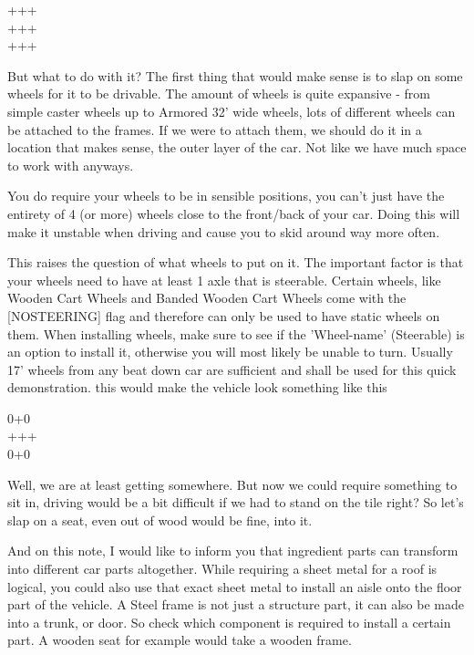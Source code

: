 \begin{spacing}{0.75}
+++\\
+++\\
+++
\end{spacing}

But what to do with it? The first thing that would make sense is to slap on some wheels for it to be drivable. The amount of wheels is quite expansive - from simple caster wheels up to Armored 32' wide wheels, lots of different wheels can be attached to the frames. If we were to attach them, we should do it in a location that makes sense, the outer layer of the car. Not like we have much space to work with anyways.

You do require your wheels to be in sensible positions, you can't just have the entirety of 4 (or more) wheels close to the front/back of your car. Doing this will make it unstable when driving and cause you to skid around way more often.

This raises the question of what wheels to put on it. The important factor is that your wheels need to have at least 1 axle that is steerable. Certain wheels, like Wooden Cart Wheels and Banded Wooden Cart Wheels come with the [NOSTEERING] flag and therefore can only be used to have static wheels on them. When installing wheels, make sure to see if the 'Wheel-name' (Steerable) is an option to install it, otherwise you will most likely be unable to turn. Usually 17' wheels from any beat down car are sufficient and shall be used for this quick demonstration.
this would make the vehicle look something like this

\vspace{0.5\baselineskip}
\begin{spacing}{0.75}
0+0\\
+++\\
0+0
\end{spacing}
\vspace{0.5\baselineskip}

Well, we are at least getting somewhere. But now we could require something to sit in, driving would be a bit difficult if we had to stand on the tile right? So let's slap on a seat, even out of wood would be fine, into it.

And on this note, I would like to inform you that ingredient parts can transform into different car parts altogether. While requiring a sheet metal for a roof is logical, you could also use that exact sheet metal to install an aisle onto the floor part of the vehicle. A Steel frame is not just a structure part, it can also be made into a trunk, or door. So check which component is required to install a certain part. A wooden seat for example would take a wooden frame.

